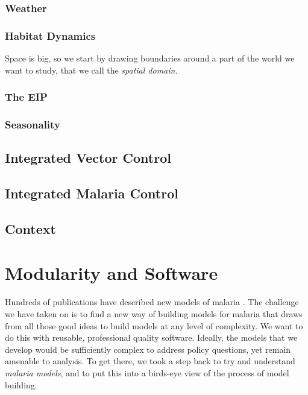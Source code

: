 \documentclass[
]{book}
\begin{document}
\subsection{Weather}\label{weather}

\subsection{Habitat Dynamics}\label{habitat-dynamics}

Space is big, so we start by drawing boundaries around a part of the world we want to study, that we call the \emph{spatial domain.}

\subsection{The EIP}\label{the-eip}

\subsection{Seasonality}\label{seasonality}

\section{Integrated Vector Control}\label{integrated-vector-control}

\section{Integrated Malaria Control}\label{integrated-malaria-control}

\section{Context}\label{context}

\chapter{Modularity and Software}\label{modularity-and-software}

Hundreds of publications have described new models of malaria \autocite{ReinerRC2013SystematicReview,SmithNR2018AgentbasedModels}. The challenge we have taken on is to find a new way of building models for malaria that draws from all those good ideas to build models at any level of complexity. We want to do this with reusable, professional quality software. Ideally, the models that we develop would be sufficiently complex to address policy questions, yet remain amenable to analysis. To get there, we took a step back to try and understand \emph{malaria models}, and to put this into a birds-eye view of the process of model building.
\end{document}
